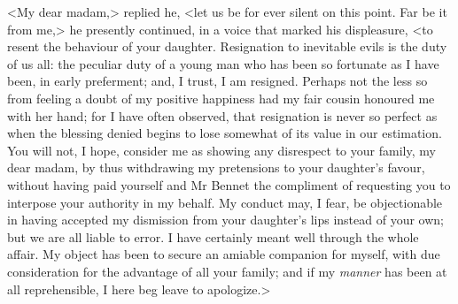 <My dear madam,> replied he, <let us be for ever silent on this point. Far be it from me,> he presently continued, in a voice that marked his displeasure, <to resent the behaviour of your daughter. Resignation to inevitable evils is the duty of us all: the peculiar duty of a young man who has been so fortunate as I have been, in early preferment; and, I trust, I am resigned. Perhaps not the less so from feeling a doubt of my positive happiness had my fair cousin honoured me with her hand; for I have often observed, that resignation is never so perfect as when the blessing denied begins to lose somewhat of its value in our estimation. You will not, I hope, consider me as showing any disrespect to your family, my dear madam, by thus withdrawing my pretensions to your daughter's favour, without having paid yourself and Mr Bennet the compliment of requesting you to interpose your authority in my behalf. My conduct may, I fear, be objectionable in having accepted my dismission from your daughter's lips instead of your own; but we are all liable to error. I have certainly meant well through the whole affair. My object has been to secure an amiable companion for myself, with due consideration for the advantage of all your family; and if my \textit{manner} has been at all reprehensible, I here beg leave to apologize.>

